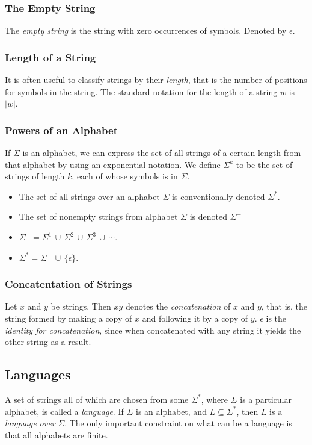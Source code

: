 \documentclass[]{article}
\begin{document}
    \subsubsection*{The Empty String}
      The \emph{empty string} is the string with zero occurrences of symbols.
      Denoted by $\epsilon$.
 
    \subsubsection*{Length of a String}
      It is often useful to classify strings by their \emph{length}, that is
      the number of positions for symbols in the string. The standard notation
      for the length of a string $w$ is $|w|$.
      
    \subsubsection*{Powers of an Alphabet}
      If $\Sigma$ is an alphabet, we can express the set of all strings of a 
      certain length from that alphabet by using an exponential notation. We
      define $\Sigma^k$ to be the set of strings of length $k$, each of whose
      symbols is in $\Sigma$.
        \begin{itemize}
          \item The set of all strings over an alphabet $\Sigma$ is
          conventionally denoted $\Sigma^*$.
          \item The set of nonempty strings from alphabet $\Sigma$ is denoted
          $\Sigma^+$
          \item $\Sigma^+ = \Sigma^1 \, \cup \, \Sigma^2 \, \cup \, \Sigma^3 \, 
          \cup \, \cdots$.
          \item $\Sigma^* = \Sigma^+ \, \cup \, \{ \epsilon \}$.
        \end{itemize}
      
    \subsubsection*{Concatentation of Strings}
      Let $x$ and $y$ be strings. Then $xy$ denotes the \emph{concatenation} of
      $x$ and $y$, that is, the string formed by making a copy of $x$ and
      following it by a copy of $y$. $\epsilon$ is the \emph{identity for
      concatenation}, since when concatenated with any string it yields the 
      other string as a result.
  
  \subsection*{Languages}
    A set of strings all of which are chosen from some $\Sigma^*$, where 
    $\Sigma$ is a particular alphabet, is called a \emph{language}. If $\Sigma$ 
    is an alphabet, and $L \subseteq \Sigma^*$, then $L$ is a \emph{language 
    over} $\Sigma$. The only important constraint on what can be a language is
    that all alphabets are finite.
    
\end{document}
